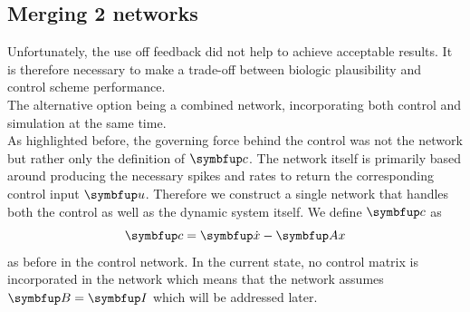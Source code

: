\subsection{Merging 2 networks}
Unfortunately, the use off feedback did not help to achieve acceptable results. It is therefore necessary to make a trade-off between biologic plausibility and control scheme performance.\\
The alternative option being a combined network, incorporating both control and simulation at the same time.\\
As highlighted before, the governing force behind the control was not the network but rather only the definition of $\bmu{c}$. The network itself is primarily based around producing the necessary spikes and rates to return the corresponding control input $\bmu{u}$.
Therefore we construct a single network that handles both the control as well as the dynamic system itself. We define $\bmu{c}$ as
\begin{equation}
	\bmu{c} =  \bmu{\dot{x}}-\bmu{Ax}
\end{equation}
as before in the control network. In the current state, no control matrix is incorporated in the network which means that the network assumes $\bmu{B} = \bmu{I}$ which will be addressed later.\\

